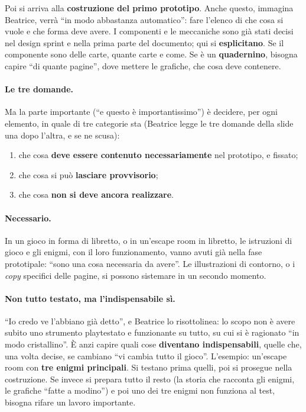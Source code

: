 Poi si arriva alla \textbf{costruzione del primo prototipo}. Anche questo, immagina
Beatrice, verrà ``in modo abbastanza automatico'': fare l'elenco di che cosa si vuole
e che forma deve avere. I componenti e le meccaniche sono già stati decisi nel design
sprint e nella prima parte del documento; qui si \textbf{esplicitano}. Se il
componente sono delle carte, quante carte e come. Se è un \textbf{quadernino}, bisogna
capire ``di quante pagine'', dove mettere le grafiche, che cosa deve contenere.

\paragraph{Le tre domande.} Ma la parte importante (``e questo è importantissimo'')
è decidere, per ogni elemento, in quale di tre categorie sta (Beatrice legge le tre
domande della slide una dopo l'altra, e se ne scusa):
\begin{enumerate}
  \item che cosa \textbf{deve essere contenuto necessariamente} nel prototipo, e
        fissato;
  \item che cosa si può \textbf{lasciare provvisorio};
  \item che cosa \textbf{non si deve ancora realizzare}.
\end{enumerate}

\paragraph{Necessario.} In un gioco in forma di libretto, o in un'escape room in
libretto, le istruzioni di gioco e gli enigmi, con il loro funzionamento, vanno
avuti già nella fase prototipale: ``sono una cosa necessaria da avere''. Le
illustrazioni di contorno, o i \emph{copy} specifici delle pagine, si possono
sistemare in un secondo momento.

\paragraph{Non tutto testato, ma l'indispensabile sì.} ``Io credo ve l'abbiano già
detto'', e Beatrice lo risottolinea: lo scopo non è avere subito uno strumento
playtestato e funzionante su tutto, su cui si è ragionato ``in modo cristallino''. È
anzi capire quali cose \textbf{diventano indispensabili}, quelle che, una volta
decise, se cambiano ``vi cambia tutto il gioco''. L'esempio: un'escape room con
\textbf{tre enigmi principali}. Si testano prima quelli, poi si prosegue nella
costruzione. Se invece si prepara tutto il resto (la storia che racconta gli enigmi,
le grafiche ``fatte a modino'') e poi uno dei tre enigmi non funziona al test, bisogna
rifare un lavoro importante.

